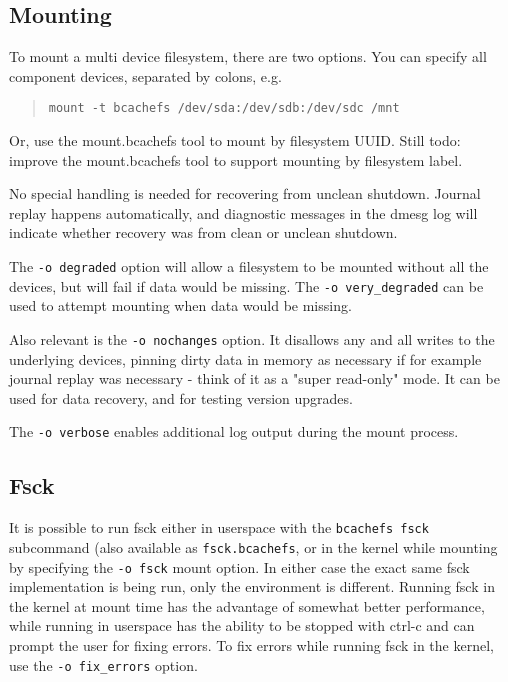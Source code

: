\documentclass{article}
\begin{document}
\subsection{Mounting}

To mount a multi device filesystem, there are two options. You can specify all
component devices, separated by colons, e.g.
\begin{quote} \begin{verbatim}
mount -t bcachefs /dev/sda:/dev/sdb:/dev/sdc /mnt
\end{verbatim} \end{quote}
Or, use the mount.bcachefs tool to mount by filesystem UUID. Still todo: improve
the mount.bcachefs tool to support mounting by filesystem label.

No special handling is needed for recovering from unclean shutdown. Journal
replay happens automatically, and diagnostic messages in the dmesg log will
indicate whether recovery was from clean or unclean shutdown.

The \texttt{-o degraded} option will allow a filesystem to be mounted without
all the devices, but will fail if data would be missing. The
\texttt{-o very\_degraded} can be used to attempt mounting when data would be
missing.

Also relevant is the \texttt{-o nochanges} option. It disallows any and all
writes to the underlying devices, pinning dirty data in memory as necessary if
for example journal replay was necessary - think of it as a "super read-only"
mode. It can be used for data recovery, and for testing version upgrades.

The \texttt{-o verbose} enables additional log output during the mount process.

\subsection{Fsck}

It is possible to run fsck either in userspace with the \texttt{bcachefs fsck}
subcommand (also available as \texttt{fsck.bcachefs}, or in the kernel while
mounting by specifying the \texttt{-o fsck} mount option. In either case the
exact same fsck implementation is being run, only the environment is different.
Running fsck in the kernel at mount time has the advantage of somewhat better
performance, while running in userspace has the ability to be stopped with
ctrl-c and can prompt the user for fixing errors. To fix errors while running
fsck in the kernel, use the \texttt{-o fix\_errors} option.
\end{document}
